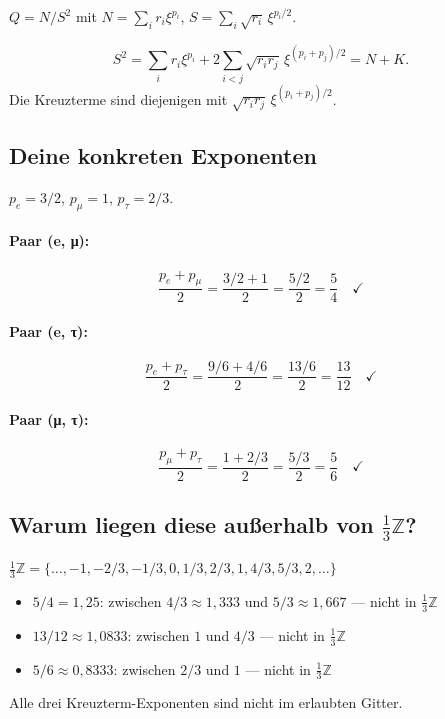 $Q=N/S^2$ mit $N=\sum_ir_i\xi^{p_i}$, $S=\sum_i\sqrt{r_i}\,\xi^{p_i/2}$.

\[
  S^2 = \sum_ir_i\xi^{p_i}+2\sum_{i<j}\sqrt{r_ir_j}\,\xi^{(p_i+p_j)/2}
  = N+K.
\]
Die Kreuzterme sind diejenigen mit $\sqrt{r_ir_j}\,\xi^{(p_i+p_j)/2}$.

\subsection{Deine konkreten Exponenten}

$p_e=3/2$, $p_\mu=1$, $p_\tau=2/3$.

\paragraph{Paar (e, μ):}
\[
  \frac{p_e+p_\mu}{2} = \frac{3/2+1}{2} = \frac{5/2}{2}
  = \boxed{\frac{5}{4}} \quad\checkmark
\]

\paragraph{Paar (e, τ):}
\[
  \frac{p_e+p_\tau}{2} = \frac{9/6+4/6}{2} = \frac{13/6}{2}
  = \boxed{\frac{13}{12}} \quad\checkmark
\]

\paragraph{Paar (μ, τ):}
\[
  \frac{p_\mu+p_\tau}{2} = \frac{1+2/3}{2} = \frac{5/3}{2}
  = \boxed{\frac{5}{6}} \quad\checkmark
\]

\subsection{Warum liegen diese außerhalb von $\tfrac{1}{3}\mathbb{Z}$?}

$\tfrac{1}{3}\mathbb{Z}=\{\ldots,-1,-2/3,-1/3,0,1/3,2/3,1,4/3,5/3,2,\ldots\}$
\begin{itemize}
  \item $5/4=1{,}25$: zwischen $4/3\approx1{,}333$ und $5/3\approx1{,}667$
        — nicht in $\tfrac{1}{3}\mathbb{Z}$
  \item $13/12\approx1{,}0833$: zwischen $1$ und $4/3$
        — nicht in $\tfrac{1}{3}\mathbb{Z}$
  \item $5/6\approx0{,}8333$: zwischen $2/3$ und $1$
        — nicht in $\tfrac{1}{3}\mathbb{Z}$
\end{itemize}
Alle drei Kreuzterm-Exponenten sind nicht im erlaubten Gitter.

